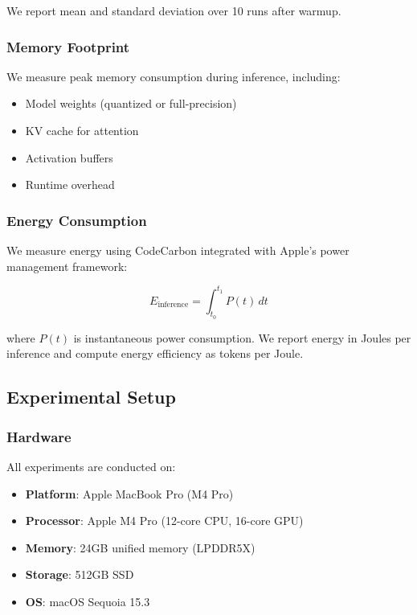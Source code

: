 \documentclass[11pt,a4paper]{article}
\begin{document}
We report mean and standard deviation over 10 runs after warmup.

\subsubsection{Memory Footprint}

We measure peak memory consumption during inference, including:

\begin{itemize}[leftmargin=*,nosep]
    \item Model weights (quantized or full-precision)
    \item KV cache for attention
    \item Activation buffers
    \item Runtime overhead
\end{itemize}

\subsubsection{Energy Consumption}

We measure energy using CodeCarbon \cite{codecarbon2023} integrated with Apple's power management framework:

\begin{equation}
E_{\text{inference}} = \int_{t_0}^{t_1} P(t) \, dt
\end{equation}

where $P(t)$ is instantaneous power consumption. We report energy in Joules per inference and compute energy efficiency as tokens per Joule.

\subsection{Experimental Setup}

\subsubsection{Hardware}

All experiments are conducted on:
\begin{itemize}[leftmargin=*,nosep]
    \item \textbf{Platform}: Apple MacBook Pro (M4 Pro)
    \item \textbf{Processor}: Apple M4 Pro (12-core CPU, 16-core GPU)
    \item \textbf{Memory}: 24GB unified memory (LPDDR5X)
    \item \textbf{Storage}: 512GB SSD
    \item \textbf{OS}: macOS Sequoia 15.3
\end{itemize}
\end{document}
